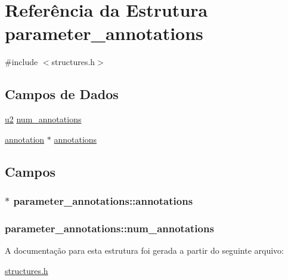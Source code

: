 \hypertarget{structparameter__annotations}{}\section{Referência da Estrutura parameter\+\_\+annotations}
\label{structparameter__annotations}


{\ttfamily \#include $<$structures.\+h$>$}

\subsection*{Campos de Dados}
\begin{DoxyCompactItemize}
\item 
\hyperlink{lista__operandos_8h_a732cde1300aafb73b0ea6c2558a7a54f}{u2} \hyperlink{structparameter__annotations_a7e5f9ee8189799d0424e291025d3c3fd}{num\+\_\+annotations}
\item 
\hyperlink{structannotation}{annotation} $\ast$ \hyperlink{structparameter__annotations_a89a4aee9ee71512a1f33395506db9d60}{annotations}
\end{DoxyCompactItemize}


\subsection{Campos}
\subsubsection[{\texorpdfstring{annotations}{annotations}}]{$\ast$ parameter\+\_\+annotations\+::annotations}\hypertarget{structparameter__annotations_a89a4aee9ee71512a1f33395506db9d60}{}\label{structparameter__annotations_a89a4aee9ee71512a1f33395506db9d60}
\subsubsection[{\texorpdfstring{num\+\_\+annotations}{num_annotations}}]{ parameter\+\_\+annotations\+::num\+\_\+annotations}\hypertarget{structparameter__annotations_a7e5f9ee8189799d0424e291025d3c3fd}{}\label{structparameter__annotations_a7e5f9ee8189799d0424e291025d3c3fd}


A documentação para esta estrutura foi gerada a partir do seguinte arquivo\+:\begin{DoxyCompactItemize}
\item 
\hyperlink{structures_8h}{structures.\+h}\end{DoxyCompactItemize}
